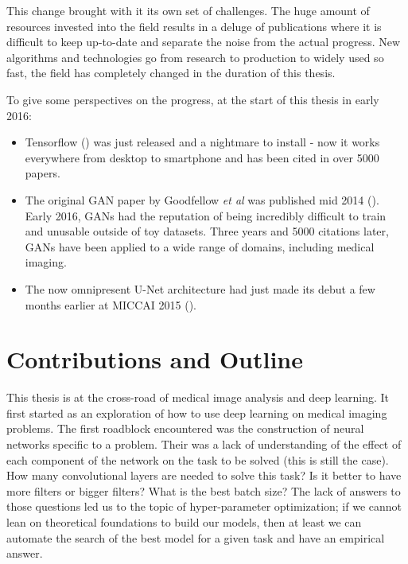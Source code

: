 This change brought with it its own set of challenges. The huge amount of resources invested into the field results in a deluge of publications where it is difficult to keep up-to-date and separate the noise from the actual progress. New algorithms and technologies go from research to production to widely used so fast, the field has completely changed in the duration of this thesis.

To give some perspectives on the progress, at the start of this thesis in early 2016: 
\begin{itemize}
    \item Tensorflow (\textcite{tensorflow2015}) was just released and a nightmare to install - now it works everywhere from desktop to smartphone and has been cited in over 5000 papers.
    \item The original GAN paper by Goodfellow \textit{et al} was published mid 2014 (\textcite{goodfellow2014}). Early 2016, GANs had the reputation of being incredibly difficult to train and unusable outside of toy datasets. Three years and 5000 citations later, GANs have been applied to a wide range of domains, including medical imaging.
    \item The now omnipresent U-Net architecture had just made its debut a few months earlier at MICCAI 2015 (\textcite{ronneberger2015MICCAI}).
\end{itemize}


\section{Contributions and Outline}

This thesis is at the cross-road of medical image analysis and deep learning. It first started as an exploration of how to use deep learning on medical imaging problems. The first roadblock encountered was the construction of neural networks specific to a problem. Their was a lack of understanding of the effect of each component of the network on the task to be solved (this is still the case). How many convolutional layers are needed to solve this task? Is it better to have more filters or bigger filters? What is the best batch size? The lack of answers to those questions led us to the topic of hyper-parameter optimization; if we cannot lean on theoretical foundations to build our models, then at least we can automate the search of the best model for a given task and have an empirical answer.

